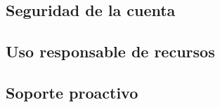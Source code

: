 \subsection{Seguridad de la cuenta}

\subsection{Uso responsable de recursos}

\subsection{Soporte proactivo}
